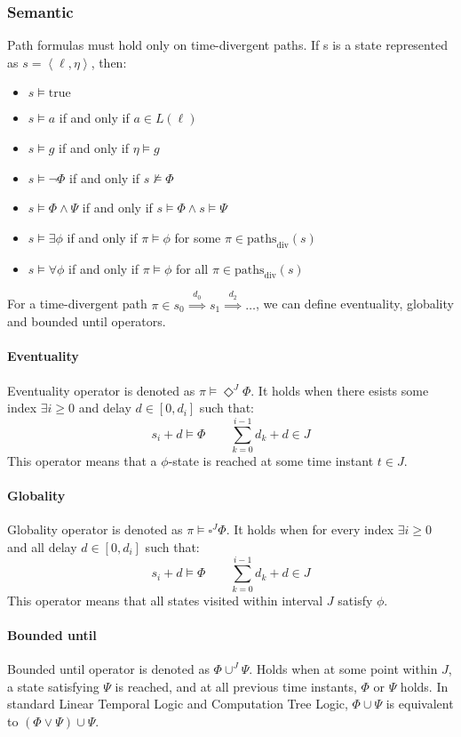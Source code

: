 \subsubsection{Semantic}
Path formulas must hold only on time-divergent paths.
If s is a state represented as $s=\left\langle \ell,\eta\right\rangle$, then:
\begin{itemize}
    \item $s\models\text{true}$
    \item $s\models a$ if and only if $a\in L(\ell)$
    \item $s\models g$ if and only if $\eta\models g$
    \item $s\models \lnot\Phi$ if and only if $s\not\models\Phi$
    \item $s\models \Phi\land\Psi$ if and only if $s\models\Phi\land s \models\Psi$
    \item $s\models \exists\phi$ if and only if $\pi\models\phi$ for some $\pi\in\text{paths}_{\text{div}}(s)$
    \item $s\models \forall\phi$ if and only if $\pi\models\phi$ for all $\pi\in\text{paths}_{\text{div}}(s)$
\end{itemize}
For a time-divergent path $\pi\in s_0\overset{d_0}{\implies}s_1\overset{d_2}{\implies}\dots$, we can define eventuality, globality and bounded until operators. 

\paragraph*{Eventuality}
Eventuality operator is denoted as $\pi\models\Diamond^J\Phi$. 
It holds when there esists some index $\exists i \geq 0$ and delay $d\in[0,d_i]$ such that: 
\[s_i+d\models\Phi\qquad \sum_{k=0}^{i-1}d_k+d\in J\]
This operator means that a $\phi$-state is reached at some time instant $t\in J$.

\paragraph*{Globality}
Globality operator is denoted as $\pi\models\square^J\Phi$. 
It holds when for every index $\exists i \geq 0$ and all delay $d\in[0,d_i]$ such that: 
\[s_i+d\models\Phi\qquad \sum_{k=0}^{i-1}d_k+d\in J\]
This operator means that all states visited within interval $J$ satisfy $\phi$. 

\paragraph*{Bounded until}
Bounded until operator is denoted as $\Phi\cup^J\Psi$. 
Holds when at some point within $J$, a state satisfying $\Psi$ is reached, and at all previous time instants, $\Phi$ or $\Psi$ holds.
In standard Linear Temporal Logic and Computation Tree Logic, $\Phi\cup\Psi$ is equivalent to $(\Phi\lor\Psi)\cup\Psi$.

